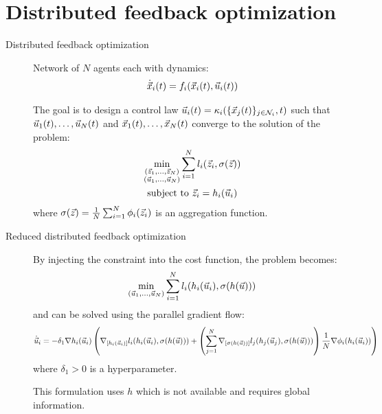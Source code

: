 \section{Distributed feedback optimization}

\begin{description}
    \item[Distributed feedback optimization]  
        Network of $N$ agents each with dynamics:
        \[
            \dot{{\vec{x}}}_i(t) = f_i({\vec{x}}_i(t), {\vec{u}}_i(t))
        \]

        The goal is to design a control law ${\vec{u}}_i(t) = \kappa_i(\{ {\vec{x}}_j(t) \}_{j \in \mathcal{N}_i}, t)$ such that ${\vec{u}}_1(t), \dots, {\vec{u}}_N(t)$ and ${\vec{x}}_1(t), \dots, {\vec{x}}_N(t)$ converge to the solution of the problem:
        \[
            \begin{gathered}
                \min_{\substack{({\vec{z}}_1, \dots, {\vec{z}}_N)\\({\vec{u}}_1, \dots, {\vec{u}}_N)}} \sum_{i=1}^{N} l_i({\vec{z}}_i, \sigma({\vec{z}})) \\
                \text{subject to } {\vec{z}}_i = h_i({\vec{u}}_i)
            \end{gathered}
        \]
        where $\sigma({\vec{z}}) = \frac{1}{N} \sum_{i=1}^{N} \phi_i({\vec{z}}_i)$ is an aggregation function.

    \item[Reduced distributed feedback optimization] 
        By injecting the constraint into the cost function, the problem becomes:
        \[
            \min_{({\vec{u}}_1, \dots, {\vec{u}}_N)} \sum_{i=1}^{N} l_i(h_i({\vec{u}}_i), \sigma(h({\vec{u}})))
        \]
        and can be solved using the parallel gradient flow:
        \[
            \small
            \dot{{\vec{u}}}_i = - \delta_1 \nabla h_i({\vec{u}}_i) \left( \nabla_{[h_i({\vec{u}}_i)]} l_i(h_i({\vec{u}}_i), \sigma(h({\vec{u}}))) + \left( \sum_{j=1}^{N} \nabla_{[\sigma(h({\vec{u}}))]} l_j(h_j({\vec{u}}_j), \sigma(h({\vec{u}}))) \right) \frac{1}{N}\nabla \phi_i(h_i({\vec{u}}_i)) \right)
        \]
        where $\delta_1 > 0$ is a hyperparameter.

        \begin{remark}
            This formulation uses $h$ which is not available and requires global information.
        \end{remark}


\end{description}
